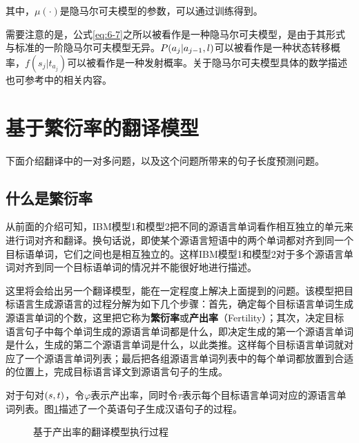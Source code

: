 \noindent 其中，$\mu( \cdot )$是隐马尔可夫模型的参数，可以通过训练得到。

\parinterval 需要注意的是，公式\eqref{eq:6-7}之所以被看作是一种隐马尔可夫模型，是由于其形式与标准的一阶隐马尔可夫模型无异。${P}(a_{j}|a_{j-1},l)$可以被看作是一种状态转移概率，$f(s_{j}|t_{a_j})$可以被看作是一种发射概率。关于隐马尔可夫模型具体的数学描述也可参考{\chapterthree}中的相关内容。




\sectionnewpage
\section{基于繁衍率的翻译模型}

下面介绍翻译中的一对多问题，以及这个问题所带来的句子长度预测问题。


\subsection{什么是繁衍率}

\parinterval 从前面的介绍可知，IBM模型1和模型2把不同的源语言单词看作相互独立的单元来进行词对齐和翻译。换句话说，即使某个源语言短语中的两个单词都对齐到同一个目标语单词，它们之间也是相互独立的。这样IBM模型1和模型2对于多个源语言单词对齐到同一个目标语单词的情况并不能很好地进行描述。

\parinterval 这里将会给出另一个翻译模型，能在一定程度上解决上面提到的问题。该模型把目标语言生成源语言的过程分解为如下几个步骤：首先，确定每个目标语言单词生成源语言单词的个数，这里把它称为{\small\sffamily\bfseries{繁衍率}}或{\small\sffamily\bfseries{产出率}}（Fertility）；其次，决定目标语言句子中每个单词生成的源语言单词都是什么，即决定生成的第一个源语言单词是什么，生成的第二个源语言单词是什么，以此类推。这样每个目标语言单词就对应了一个源语言单词列表；最后把各组源语言单词列表中的每个单词都放置到合适的位置上，完成目标语言译文到源语言句子的生成。

\parinterval 对于句对$({s},{t})$，令$\varphi$表示产出率，同时令${\tau}$表示每个目标语言单词对应的源语言单词列表。图{\ref{fig:6-5}}描述了一个英语句子生成汉语句子的过程。
\begin{figure}[htp]
    \centering

   \caption{基于产出率的翻译模型执行过程}
   \label{fig:6-5}
\end{figure}

